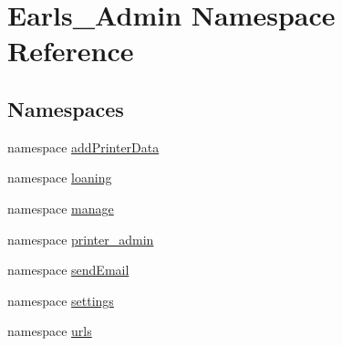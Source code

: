 \hypertarget{namespaceEarls__Admin}{
\section{Earls\_\-Admin Namespace Reference}
\label{namespaceEarls__Admin}
}


\subsection*{Namespaces}
\begin{CompactItemize}
\item 
namespace \hyperlink{namespaceEarls__Admin_1_1addPrinterData}{addPrinterData}
\item 
namespace \hyperlink{namespaceEarls__Admin_1_1loaning}{loaning}
\item 
namespace \hyperlink{namespaceEarls__Admin_1_1manage}{manage}
\item 
namespace \hyperlink{namespaceEarls__Admin_1_1printer__admin}{printer\_\-admin}
\item 
namespace \hyperlink{namespaceEarls__Admin_1_1sendEmail}{sendEmail}
\item 
namespace \hyperlink{namespaceEarls__Admin_1_1settings}{settings}
\item 
namespace \hyperlink{namespaceEarls__Admin_1_1urls}{urls}
\end{CompactItemize}
